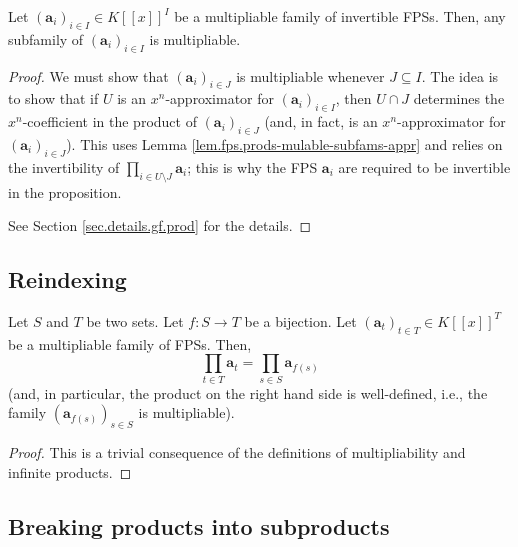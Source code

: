 \begin{proposition}
\label{prop.fps.prods-mulable-subfams}
\leantarget
\leanok
Let $\left(\mathbf{a}_{i}\right)_{i\in I}\in K\left[\left[x\right]\right]^{I}$
be a multipliable family of invertible FPSs. Then, any subfamily of
$\left(\mathbf{a}_{i}\right)_{i\in I}$ is multipliable.
\end{proposition}

\begin{proof}
\leanok
We must show that $(\mathbf{a}_i)_{i\in J}$ is multipliable whenever
$J \subseteq I$. The idea is to show that if $U$ is an $x^{n}$-approximator
for $\left(\mathbf{a}_{i}\right)_{i\in I}$, then $U\cap J$ determines the
$x^{n}$-coefficient in the product of $\left(\mathbf{a}_{i}\right)_{i\in J}$
(and, in fact, is an $x^{n}$-approximator for
$\left(\mathbf{a}_{i}\right)_{i\in J}$). This uses Lemma
\ref{lem.fps.prods-mulable-subfams-appr} and relies on the invertibility of
$\prod_{i\in U\setminus J}\mathbf{a}_{i}$; this is why the FPS
$\mathbf{a}_{i}$ are required to be invertible in the proposition.

See Section \ref{sec.details.gf.prod} for the details.
\end{proof}

\subsection{Reindexing}

\begin{proposition}
\label{prop.fps.prods-mulable-rules.reindex}
\leantarget
\leanok
Let $S$ and $T$ be two sets. Let $f:S\rightarrow T$ be a bijection. Let
$\left(\mathbf{a}_{t}\right)_{t\in T}\in K\left[\left[x\right]\right]^{T}$
be a multipliable family of FPSs. Then,
\[
\prod_{t\in T}\mathbf{a}_{t}=\prod_{s\in S}\mathbf{a}_{f\left(s\right)}
\]
(and, in particular, the product on the right hand side is well-defined, i.e.,
the family $\left(\mathbf{a}_{f\left(s\right)}\right)_{s\in S}$ is multipliable).
\end{proposition}

\begin{proof}
This is a trivial consequence of the definitions of multipliability and
infinite products.
\end{proof}

\subsection{Breaking products into subproducts}

